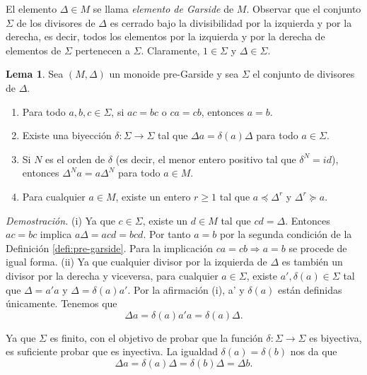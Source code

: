 \documentclass[12pt]{article}
\theoremstyle{definition}
\newtheorem{lema}{Lema}[section]
\begin{document}
El elemento $\Delta\in M$ se llama \textit{elemento de Garside} de $M$. Observar que el conjunto $\Sigma$ de los divisores de $\Delta$ es cerrado bajo la divisibilidad por la izquierda y por la derecha, es decir, todos los elementos por la izquierda y por la derecha de elementos de $\Sigma$ pertenecen a $\Sigma$. Claramente, $1\in\Sigma$ y $\Delta\in\Sigma$.

\begin{lema}
Sea $(M,\Delta)$ un monoide pre-Garside y sea $\Sigma$ el conjunto de divisores de $\Delta$.

\begin{enumerate}[label=(\roman*).]
\item Para todo $a,b,c\in\Sigma$, si $ac=bc$ o $ca=cb$, entonces $a=b$.
\item Existe una biyección $\delta:\Sigma\rightarrow \Sigma$ tal que $\Delta a=\delta(a)\Delta$ para todo $a\in\Sigma$.
\item Si $N$ es el orden de $\delta$ (es decir, el menor entero positivo tal que $\delta^{N}=id$), entonces $\Delta^N a=a\Delta^N$ para todo $a\in M$.
\item Para cualquier $a\in M$, existe un entero $r\geq 1$ tal que $a\preceq\Delta^r$ y $\Delta^r\succeq a$.
\end{enumerate}
\label{lema:pre-garside}
\end{lema}

\textit{Demostración.} (i) Ya que $c\in\Sigma$, existe un $d\in M$ tal que $cd=\Delta$. Entonces $ac=bc$ implica $a\Delta = acd=bcd$. Por tanto $a=b$ por la segunda condición de la Definición \ref{defi:pre-garside}. Para la implicación $ca=cb\Rightarrow a=b$ se procede de igual forma.
\newline
\newline
(ii) Ya que cualquier divisor por la izquierda de $\Delta$ es también un divisor por la derecha y viceversa, para cualquier $a\in\Sigma$, existe $a',\delta(a)\in\Sigma$ tal que $\Delta =a'a$ y $\Delta = \delta(a)a'$. Por la afirmación (i), a' y $\delta(a)$ están definidas únicamente. Tenemos que
\begin{equation}
\Delta a=\delta(a)a'a=\delta(a)\Delta.
\label{eq:deltas}
\end{equation}

Ya que $\Sigma$ es finito, con el objetivo de probar que la función $\delta:\Sigma\rightarrow\Sigma$ es biyectiva, es suficiente probar que es inyectiva. La igualdad $\delta(a)=\delta(b)$ nos da que
$$\Delta a= \delta(a)\Delta = \delta(b)\Delta = \Delta b.$$
\end{document}

